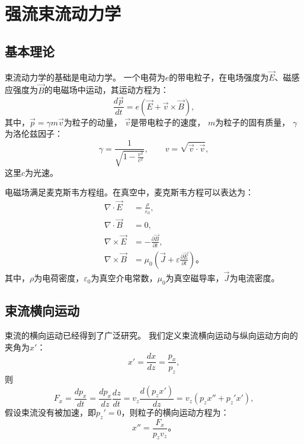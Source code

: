 
\chapter{强流束流动力学}
\label{chap:AccBasic}

\section{基本理论}
束流动力学的基础是电动力学\cite{jackson1975electrodynamics,guo1979electrodynamics}。
一个电荷为$e$的带电粒子，在电场强度为$\vec{E}$、磁感应强度为$\vec{B}$的电磁场中运动，其运动方程为：
\begin{equation}
    \label{eq:Newton}
    \frac{d \vec{p}}{dt}=e(\vec{E}+\vec{v} \times \vec{B}),
\end{equation}
其中，$\vec{p}=\gamma m \vec{v}$为粒子的动量，
$\vec{v}$是带电粒子的速度，
$m$为粒子的固有质量，
$\gamma$为洛伦兹因子：
\begin{equation}
    \label{eq:Lorentz}
    \gamma = \frac{1}{\sqrt{1-\frac{v^2}{c^2}}}, \qquad v = \sqrt{\vec{v} \cdot \vec{v}},
\end{equation}
这里$c$为光速。

电磁场满足麦克斯韦方程组。在真空中，麦克斯韦方程可以表达为：
\begin{equation}
    \label{eq:Maxwell}
    \begin{aligned}
    \nabla \cdot \vec{E}  &= \frac{\rho}{{\varepsilon}_{0}}, \\
    \nabla \cdot \vec{B}  &= 0, \\
    \nabla \times \vec{E} &= -\frac{\partial \vec{B}}{\partial {t}}, \\
    \nabla \times \vec{B} &= {\mu}_{0}\left(\vec{J}+\varepsilon \frac{\partial \vec{E}}{\partial {t}}\right) \text{。}
    \end{aligned}
\end{equation}
其中，$\rho$为电荷密度，$\varepsilon _0$为真空介电常数，${\mu}_{0}$为真空磁导率，$\vec{J}$为电流密度。

\section{束流横向运动}
束流的横向运动已经得到了广泛研究\cite{qinq2011ring,accelerator2004lee,accelerator2013chao}。
我们定义束流横向运动与纵向运动方向的夹角为$x'$：
\begin{equation}
    \label{eq:transverse1}
    x'=\frac{dx}{dz}=\frac{p_x}{p_z},
\end{equation}
则
\begin{equation}
    \label{eq:transverse2}
    F_x =\frac{dp_x}{dt}=\frac{dp_x}{dz}\frac{dz}{dt}=v_z \frac{d(p_z x')}{dz}=v_z(p_z x''+p_z'x'),
\end{equation}
假设束流没有被加速，即$p_z'=0$，则粒子的横向运动方程为：
\begin{equation}
    \label{eq:transverse3}
    x'' = \frac{F_x}{p_z v_z} \text{。}
\end{equation}

